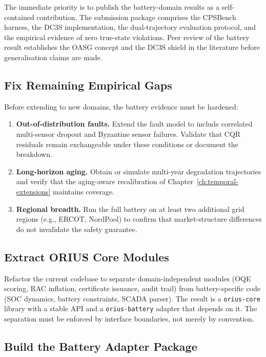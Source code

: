 The immediate priority is to publish the battery-domain results as a
self-contained contribution.  The submission package comprises the CPSBench
harness, the DC3S implementation, the dual-trajectory evaluation protocol,
and the empirical evidence of zero true-state violations.  Peer review of
the battery result establishes the OASG concept and the DC3S shield in the
literature before generalisation claims are made.

\subsection{Fix Remaining Empirical Gaps}

Before extending to new domains, the battery evidence must be hardened:

\begin{enumerate}
  \item \textbf{Out-of-distribution faults.}  Extend the fault model to
    include correlated multi-sensor dropout and Byzantine sensor failures.
    Validate that CQR residuals remain exchangeable under these conditions
    or document the breakdown.
  \item \textbf{Long-horizon aging.}  Obtain or simulate multi-year
    degradation trajectories and verify that the aging-aware recalibration
    of Chapter~\ref{ch:temporal-extensions} maintains coverage.
  \item \textbf{Regional breadth.}  Run the full battery on at least two
    additional grid regions (e.g., ERCOT, NordPool) to confirm that
    market-structure differences do not invalidate the safety guarantee.
\end{enumerate}

\subsection{Extract ORIUS Core Modules}

Refactor the current codebase to separate domain-independent modules
(OQE scoring, RAC inflation, certificate issuance, audit trail) from
battery-specific code (SOC dynamics, battery constraints, SCADA parser).
The result is a \texttt{orius-core} library with a stable API and a
\texttt{orius-battery} adapter that depends on it.  The separation must
be enforced by interface boundaries, not merely by convention.

\subsection{Build the Battery Adapter Package}

